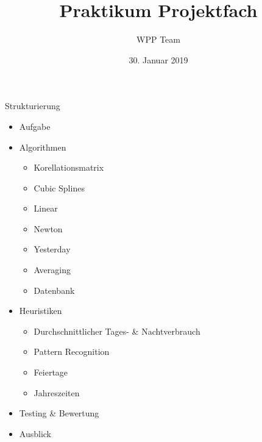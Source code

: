 \documentclass{beamer}           %
\title[WPP]{Praktikum Projektfach}
\author[Team]{WPP Team}
\institute{Hochschule Niederrhein - Fachbereich Elektrotechnik \& Informatik}
\date{30. Januar 2019}
\begin{document}
\frame[plain]{\titlepage}



\begin{frame}{Strukturierung}
	\begin{itemize}
		\item Aufgabe %
		\item Algorithmen %
		\begin{itemize}
			\item Korellationsmatrix %
			\item Cubic Splines %
			\item Linear %
			\item Newton %
			\item Yesterday %
			\item Averaging %
			\item Datenbank %
		\end{itemize}
		\item Heuristiken %
		\begin{itemize}
			\item Durchschnittlicher Tages- \& Nachtverbrauch %
			\item Pattern Recognition %
			\item Feiertage %
			\item Jahreszeiten %
		\end{itemize}
		\item Testing \& Bewertung %
		\item Ausblick %
	\end{itemize}
\end{frame}



\begin{frame}{}
\fontsize{24pt}{12pt}\selectfont
{}
\end{frame}
\end{document}
